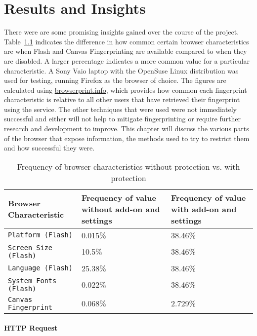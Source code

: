 \chapter{Results and Insights}

There were are some promising insights gained over the course of the project.
Table~\ref{tab:results} indicates the difference in how common certain browser characteristics are when Flash and Canvas Fingerprinting are available compared to when they are disabled.
A larger percentage indicates a more common value for a particular characteristic.
A Sony Vaio laptop with the OpenSuse Linux distribution was used for testing, running Firefox as the browser of choice.
The figures are calculated using \url{browserprint.info}, which provides how common each fingerprint characteristic is relative to all other users that have retrieved their fingerprint using the service.
The other techniques that were used were not immediately successful and either will not help to mitigate fingerprinting or require further research and development to improve.
This chapter will discuss the various parts of the browser that expose information, the methods used to try to restrict them and how successful they were.

\begin{table}[h!]
\centering
\begin{tabular}{| p{6cm} | p{4cm} | p{4cm} |}
    \hline
    \textbf{Browser Characteristic} & \textbf{Frequency of value without add-on and settings} & \textbf{Frequency of value with add-on and settings} \\ \hline
    \texttt{Platform (Flash)} & {0.015\%} & {38.46\%} \\ \hline
    \texttt{Screen Size (Flash)} & {10.5\%} & {38.46\%} \\ \hline
    \texttt{Language (Flash)} & {25.38\%} & {38.46\%} \\ \hline
    \texttt{System Fonts (Flash)} & {0.022\%} & {38.46\%} \\ \hline
    \texttt{Canvas Fingerprint} & {0.068\%} & {2.729\%} \\
    \hline
\end{tabular}
\caption{Frequency of browser characteristics without protection vs. with protection}
\label{tab:results}
\end{table}

\subsubsection{HTTP Request}



